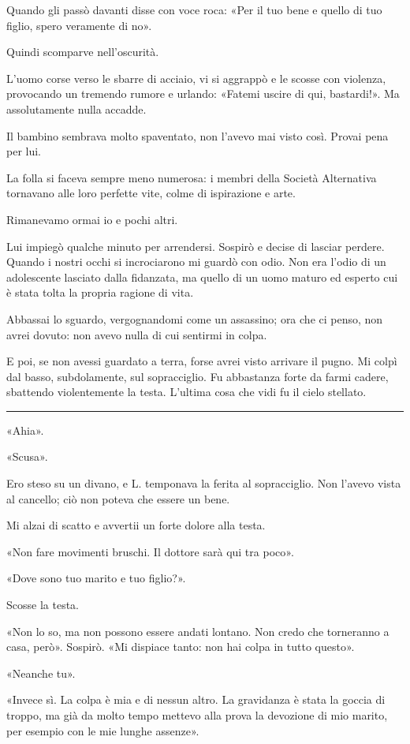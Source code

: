 \documentclass[a4paper,11pt,oneside,openright,final]{memoir}
\begin{document}
Quando gli passò davanti disse con voce roca: «Per il tuo bene e quello di tuo
figlio, spero veramente di no».

Quindi scomparve nell'oscurità.

L'uomo corse verso le sbarre di acciaio, vi si aggrappò e le scosse con
violenza, provocando un tremendo rumore e urlando: «Fatemi uscire di qui,
bastardi!». Ma assolutamente nulla accadde.

Il bambino sembrava molto spaventato, non l'avevo mai visto così. Provai pena
per lui.

La folla si faceva sempre meno numerosa: i membri della Società Alternativa
tornavano alle loro perfette vite, colme di ispirazione e arte.

Rimanevamo ormai io e pochi altri.

Lui impiegò qualche minuto per arrendersi. Sospirò e decise di lasciar perdere.
Quando i nostri occhi si incrociarono mi guardò con odio. Non era l'odio di un
adolescente lasciato dalla fidanzata, ma quello di un uomo maturo ed esperto cui
è stata tolta la propria ragione di vita.

Abbassai lo sguardo, vergognandomi come un assassino; ora che ci penso, non
avrei dovuto: non avevo nulla di cui sentirmi in colpa.

E poi, se non avessi guardato a terra, forse avrei visto arrivare il pugno.
Mi colpì dal basso, subdolamente, sul sopracciglio. Fu abbastanza forte da farmi
cadere, sbattendo violentemente la testa. L'ultima cosa che vidi fu il cielo
stellato.

\plainbreak{1}

«Ahia».

«Scusa».

Ero steso su un divano, e L. temponava la ferita al sopracciglio. Non l'avevo
vista al cancello; ciò non poteva che essere un bene.

Mi alzai di scatto e avvertii un forte dolore alla testa.

«Non fare movimenti bruschi. Il dottore sarà qui tra poco».

«Dove sono tuo marito e tuo figlio?».

Scosse la testa.

«Non lo so, ma non possono essere andati lontano. Non credo che torneranno a
casa, però». Sospirò. «Mi dispiace tanto: non hai colpa in tutto questo».

«Neanche tu».

«Invece sì. La colpa è mia e di nessun altro. La gravidanza è stata la goccia di
troppo, ma già da molto tempo mettevo alla prova la devozione di mio marito, per
esempio con le mie lunghe assenze».
\end{document}
